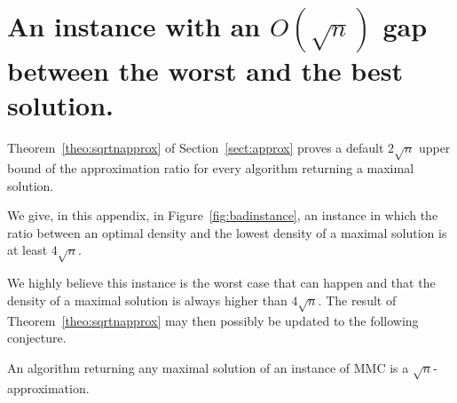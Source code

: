 \section{An instance with an $O(\sqrt{n})$ gap between the worst and the best solution.}

\label{apx:badinstance}


Theorem~\ref{theo:sqrtnapprox} of Section~\ref{sect:approx} proves a default $2\sqrt{n}$ upper bound of the approximation ratio for every algorithm returning a maximal solution.

We give, in this appendix, in Figure~\ref{fig:badinstance}, an instance in which the ratio between an optimal density and the lowest density of a maximal solution is at least $4\sqrt{n}$.



We highly believe this instance is the worst case that can happen and that the density of a maximal solution is always higher than $4\sqrt{n}$. The result of Theorem~\ref{theo:sqrtnapprox} may then possibly be updated to the following conjecture. 

\begin{conjecture}
	An algorithm returning any maximal solution of an instance of MMC is a $\sqrt{n}$-approximation.
\end{conjecture}